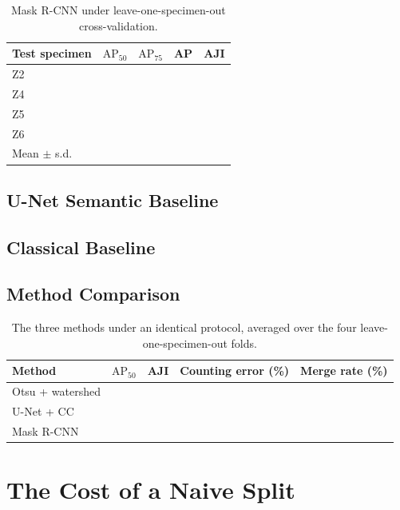 \begin{table}[htbp]
    \centering
    \caption{Mask R-CNN under leave-one-specimen-out cross-validation.}
    \label{tab:maskrcnn_results}
    \begin{tabular}{lrrrr}
        \toprule
        Test specimen & $\mathrm{AP}_{50}$ & $\mathrm{AP}_{75}$ & AP & AJI \\
        \midrule
        Z2 & & & & \\
        Z4 & & & & \\
        Z5 & & & & \\
        Z6 & & & & \\
        \midrule
        Mean $\pm$ s.d. & & & & \\
        \bottomrule
    \end{tabular}
\end{table}

\subsection{U-Net Semantic Baseline}

\subsection{Classical Baseline}

\subsection{Method Comparison}

\begin{table}[htbp]
    \centering
    \caption{The three methods under an identical protocol, averaged over the four
    leave-one-specimen-out folds.}
    \label{tab:method_comparison}
    \begin{tabular}{lrrrr}
        \toprule
        Method & $\mathrm{AP}_{50}$ & AJI & Counting error (\%) & Merge rate (\%) \\
        \midrule
        Otsu + watershed & & & & \\
        U-Net + CC       & & & & \\
        Mask R-CNN       & & & & \\
        \bottomrule
    \end{tabular}
\end{table}

\section{The Cost of a Naive Split}

